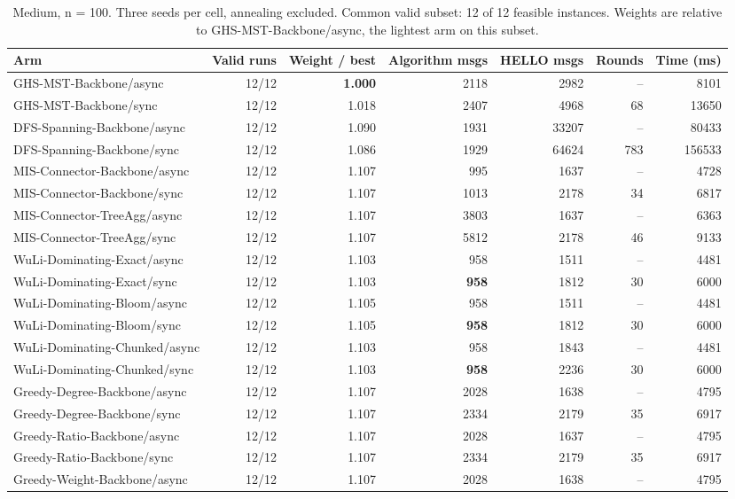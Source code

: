 \begin{table}[tb]
\centering
\caption{Medium, n = 100. Three seeds per cell, annealing excluded. Common valid subset: 12 of 12 feasible instances. Weights are relative to GHS-MST-Backbone/async, the lightest arm on this subset.}
\label{tab:cmp-sweep_medium_n100_fixed}
\begin{tabular}{lrrrrrr}
\toprule
Arm & Valid runs & Weight / best & Algorithm msgs & HELLO msgs & Rounds & Time (ms) \\
\midrule
GHS-MST-Backbone/async & 12/12 & \textbf{1.000} & 2118 & 2982 & -- & 8101 \\
GHS-MST-Backbone/sync & 12/12 & 1.018 & 2407 & 4968 & 68 & 13650 \\
DFS-Spanning-Backbone/async & 12/12 & 1.090 & 1931 & 33207 & -- & 80433 \\
DFS-Spanning-Backbone/sync & 12/12 & 1.086 & 1929 & 64624 & 783 & 156533 \\
MIS-Connector-Backbone/async & 12/12 & 1.107 & 995 & 1637 & -- & 4728 \\
MIS-Connector-Backbone/sync & 12/12 & 1.107 & 1013 & 2178 & 34 & 6817 \\
MIS-Connector-TreeAgg/async & 12/12 & 1.107 & 3803 & 1637 & -- & 6363 \\
MIS-Connector-TreeAgg/sync & 12/12 & 1.107 & 5812 & 2178 & 46 & 9133 \\
WuLi-Dominating-Exact/async & 12/12 & 1.103 & 958 & 1511 & -- & 4481 \\
WuLi-Dominating-Exact/sync & 12/12 & 1.103 & \textbf{958} & 1812 & 30 & 6000 \\
WuLi-Dominating-Bloom/async & 12/12 & 1.105 & 958 & 1511 & -- & 4481 \\
WuLi-Dominating-Bloom/sync & 12/12 & 1.105 & \textbf{958} & 1812 & 30 & 6000 \\
WuLi-Dominating-Chunked/async & 12/12 & 1.103 & 958 & 1843 & -- & 4481 \\
WuLi-Dominating-Chunked/sync & 12/12 & 1.103 & \textbf{958} & 2236 & 30 & 6000 \\
Greedy-Degree-Backbone/async & 12/12 & 1.107 & 2028 & 1638 & -- & 4795 \\
Greedy-Degree-Backbone/sync & 12/12 & 1.107 & 2334 & 2179 & 35 & 6917 \\
Greedy-Ratio-Backbone/async & 12/12 & 1.107 & 2028 & 1637 & -- & 4795 \\
Greedy-Ratio-Backbone/sync & 12/12 & 1.107 & 2334 & 2179 & 35 & 6917 \\
Greedy-Weight-Backbone/async & 12/12 & 1.107 & 2028 & 1638 & -- & 4795 \\

\end{tabular}
\end{table}
